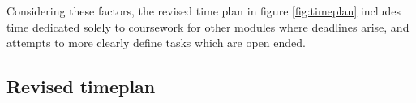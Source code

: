 Considering these factors, the revised time plan in figure \ref{fig:timeplan} includes time dedicated solely to coursework for other modules where deadlines arise, and attempts to more clearly define tasks which are open ended.
\begin{landscape}
\subsection{Revised timeplan}
\begin{figure}[H]
	\centering
\end{figure}
\begin{figure}[h]
\centering
 \fbox{
}
\end{figure}
\end{landscape}
